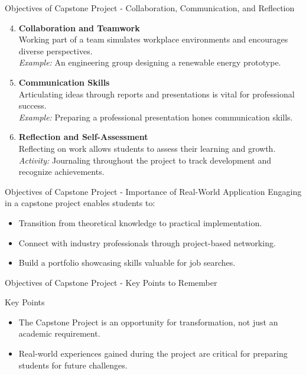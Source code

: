 \documentclass[aspectratio=169]{beamer}
\begin{document}
\begin{frame}[fragile]{Objectives of Capstone Project - Collaboration, Communication, and Reflection}
    \begin{enumerate}
        \setcounter{enumi}{3} %
        \item \textbf{Collaboration and Teamwork}\\
            Working part of a team simulates workplace environments and encourages diverse perspectives.\\
            \textit{Example:} An engineering group designing a renewable energy prototype.

        \item \textbf{Communication Skills}\\
            Articulating ideas through reports and presentations is vital for professional success.\\
            \textit{Example:} Preparing a professional presentation hones communication skills.

        \item \textbf{Reflection and Self-Assessment}\\
            Reflecting on work allows students to assess their learning and growth.\\
            \textit{Activity:} Journaling throughout the project to track development and recognize achievements.
    \end{enumerate}
\end{frame}

\begin{frame}[fragile]{Objectives of Capstone Project - Importance of Real-World Application}
    Engaging in a capstone project enables students to:
    \begin{itemize}
        \item Transition from theoretical knowledge to practical implementation.
        \item Connect with industry professionals through project-based networking.
        \item Build a portfolio showcasing skills valuable for job searches.
    \end{itemize}
\end{frame}

\begin{frame}[fragile]{Objectives of Capstone Project - Key Points to Remember}
    \begin{block}{Key Points}
        \begin{itemize}
            \item The Capstone Project is an opportunity for transformation, not just an academic requirement.
            \item Real-world experiences gained during the project are critical for preparing students for future challenges.
        \end{itemize}
    \end{block}
\end{frame}
\end{document}
